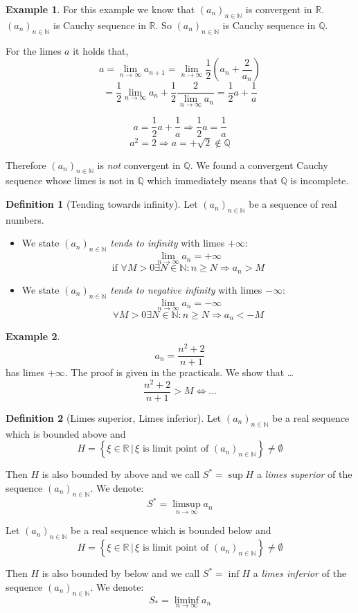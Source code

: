 \documentclass[a4paper,landscape,twocolumn]{article}
\theoremstyle{definition}
\newtheorem{defi}{Definition}
\newtheorem{ex}{Example}
\newcommand\setdef[2]{\left\{#1\,|\,#2\right\}}
\newcommand\seq[1]{{\left(#1\right)}_{n \in \mathbb N}}
\begin{document}
\begin{ex}
  For this example we know that $\seq{a_n}$ is convergent in $\mathbb R$.
  $\seq{a_n}$ is Cauchy sequence in $\mathbb R$.
  So $\seq{a_n}$ is Cauchy sequence in $\mathbb Q$.

  For the limes $a$ it holds that,
  \[ a = \lim_{n\to\infty} a_{n+1} = \lim_{n\to\infty} \frac12 \left(a_n + \frac{2}{a_n}\right) \]
  \[ = \frac12 \lim_{n\to\infty} a_n + \frac12 \frac{2}{\lim_{n\to\infty} a_n} = \frac12 a + \frac1a \]

  \[ a = \frac12 a + \frac1a \Rightarrow \frac12 a = \frac1a \]
  \[ a^2 = 2 \Rightarrow a = +\sqrt{2} \not\in \mathbb Q \]

  Therefore $\seq{a_n}$ is \emph{not} convergent in $\mathbb Q$.
  We found a convergent Cauchy sequence whose limes is not in $\mathbb Q$ which
  immediately means that $\mathbb Q$ is incomplete.
\end{ex}

\begin{defi}[Tending towards infinity]
  Let $\seq{a_n}$ be a sequence of real numbers.
  \begin{itemize}
    \item
      We state $\seq{a_n}$ \emph{tends to infinity} with limes $+\infty$:
      \[ \lim_{n\to\infty} a_n = +\infty \]
      \[ \text{if } \forall M > 0 \exists N \in \mathbb N: n \geq N \Rightarrow a_n > M \]
    \item
      We state $\seq{a_n}$ \emph{tends to negative infinity} with limes $-\infty$:
      \[ \lim_{n\to\infty} a_n = -\infty \]
      \[ \forall M > 0 \exists N \in \mathbb N: n \geq N \Rightarrow a_n < -M \]
  \end{itemize}
\end{defi}
\begin{ex}
  \[ a_n = \frac{n^2 + 2}{n+1} \]
  has limes $+\infty$.
  The proof is given in the practicals. We show that \dots
  \[ \frac{n^2 + 2}{n + 1} > M \Leftrightarrow \dots \]
\end{ex}

\begin{defi}[Limes superior, Limes inferior]
  Let $\seq{a_n}$ be a real sequence which is bounded above and
  \[ H = \setdef{\xi \in \mathbb R}{\xi \text{ is limit point of } \seq{a_n}} \neq \emptyset \]

  Then $H$ is also bounded by above and we call $S^* = \sup{H}$ a \emph{limes superior}
  of the sequence $\seq{a_n}$. We denote:
  \[ S^* = \limsup_{n\to\infty} a_n \]

  Let $\seq{a_n}$ be a real sequence which is bounded below and
  \[ H = \setdef{\xi \in \mathbb R}{\xi \text{ is limit point of } \seq{a_n}} \neq \emptyset \]

  Then $H$ is also bounded by below and we call $S^* = \inf{H}$ a \emph{limes inferior}
  of the sequence $\seq{a_n}$. We denote:
  \[ S_* = \liminf_{n\to\infty} a_n \]
\end{defi}
\end{document}

